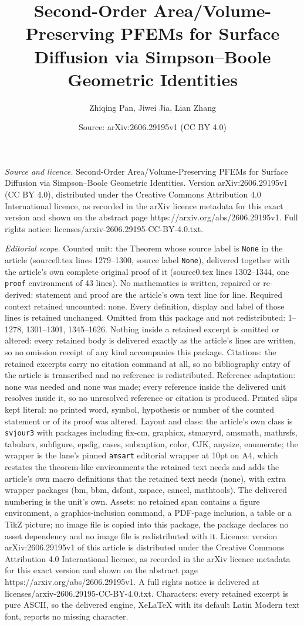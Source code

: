 \documentclass[10pt,a4paper]{amsart}
\title[Second-Order Area/Volume-Preserving PFEMs for Surface Diffus]{Second-Order Area/Volume-Preserving PFEMs for Surface Diffusion via Simpson--Boole Geometric Identities}
\author{Zhiqing Pan, Jiwei Jia, Lian Zhang}
\date{Source: arXiv:2606.29195v1 (CC BY 4.0)}
\begin{document}
\maketitle

\noindent\emph{Source and licence.} Second-Order Area/Volume-Preserving PFEMs for Surface Diffusion via Simpson--Boole Geometric Identities. Version arXiv:2606.29195v1 (CC BY 4.0), distributed under the Creative Commons Attribution 4.0 International licence, as recorded in the arXiv licence metadata for this exact version and shown on the abstract page https://arxiv.org/abs/2606.29195v1. Full rights notice: licenses/arxiv-2606.29195-CC-BY-4.0.txt.\par\smallskip

\noindent\textit{Editorial scope.} Counted unit: the Theorem whose source label is \texttt{None} in the article (source0.tex lines 1279--1300, source label \texttt{None}), delivered together with the article's own complete original proof of it (source0.tex lines 1302--1344, one \texttt{proof} environment of 43 lines). No mathematics is written, repaired or re-derived: statement and proof are the article's own text line for line. Required context retained uncounted: none. Every definition, display and label of those lines is retained unchanged. Omitted from this package and not redistributed: 1--1278, 1301--1301, 1345--1626. Nothing inside a retained excerpt is omitted or altered: every retained body is delivered exactly as the article's lines are written, so no omission receipt of any kind accompanies this package. Citations: the retained excerpts carry no citation command at all, so no bibliography entry of the article is transcribed and no reference is redistributed. Reference adaptation: none was needed and none was made; every reference inside the delivered unit resolves inside it, so no unresolved reference or citation is produced. Printed slips kept literal: no printed word, symbol, hypothesis or number of the counted statement or of its proof was altered. Layout and class: the article's own class is \texttt{svjour3} with packages including fix-cm, graphicx, stmaryrd, amsmath, mathrsfs, tabularx, subfigure, epsfig, cases, subcaption, color, CJK, anysize, enumerate; the wrapper is the lane's pinned \texttt{amsart} editorial wrapper at 10pt on A4, which restates the theorem-like environments the retained text needs and adds the article's own macro definitions that the retained text needs (none), with extra wrapper packages (bm, bbm, dsfont, xspace, cancel, mathtools). The delivered numbering is the unit's own. Assets: no retained span contains a figure environment, a graphics-inclusion command, a PDF-page inclusion, a table or a TikZ picture; no image file is copied into this package, the package declares no asset dependency and no image file is redistributed with it. Licence: version arXiv:2606.29195v1 of this article is distributed under the Creative Commons Attribution 4.0 International licence, as recorded in the arXiv licence metadata for this exact version and shown on the abstract page https://arxiv.org/abs/2606.29195v1. A full rights notice is delivered at licenses/arxiv-2606.29195-CC-BY-4.0.txt. Characters: every retained excerpt is pure ASCII, so the delivered engine, XeLaTeX with its default Latin Modern text font, reports no missing character.
\end{document}

